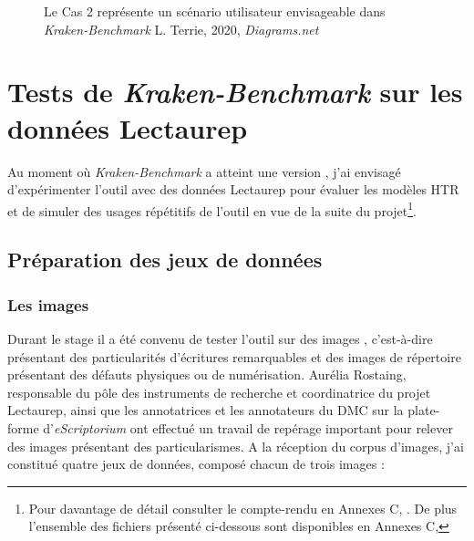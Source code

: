 \begin{figure}[h!]
    \centering
    \centerline{}
    \caption{Le Cas 2 représente un scénario utilisateur envisageable dans \textit{Kraken-Benchmark} \textcopyright L. Terrie, 2020, \textit{Diagrams.net}}
    \label{fig:TEI-KB}
\end{figure}

\thispagestyle{empty}
\chapter{Tests de \textit{Kraken-Benchmark} sur les données Lectaurep}\label{tests_KB_lectaurep}

Au moment où \textit{Kraken-Benchmark} a atteint une version , j'ai envisagé d'expérimenter l'outil avec des données Lectaurep pour évaluer les modèles HTR et de simuler des usages répétitifs de l'outil en vue de la suite du projet\footnote{Pour davantage de détail consulter le compte-rendu en Annexes C, . De plus l'ensemble des fichiers présenté ci-dessous sont disponibles en Annexes C, }.

\section{Préparation des jeux de données} 

\subsection{Les images} 
Durant le stage il a été convenu de tester l'outil sur des images , c'est-à-dire présentant des particularités d'écritures remarquables et des images de répertoire présentant des défauts physiques ou de numérisation. Aurélia Rostaing, responsable du pôle des instruments de recherche et coordinatrice du projet Lectaurep, ainsi que les annotatrices et les annotateurs du DMC sur la plate-forme d'\textit{eScriptorium} ont effectué un travail de repérage important pour relever des images présentant des particularismes. A la réception du corpus d'images, j'ai constitué quatre jeux de données, composé chacun de trois images :

